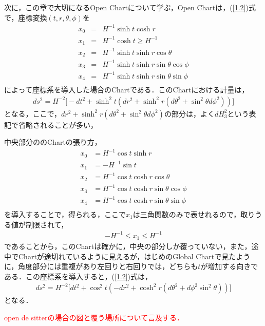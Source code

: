 次に，この章で大切になるOpen Chartについて学ぶ，Open Chartは，(\ref{1.2})式で，座標変換$(t,r,\theta,\phi)$を
\begin{eqnarray}
  x_0&=&H^{-1}\sinh{t}\cosh{r} \\
  x_1&=&H^{-1}\cosh{t} \geqslant H^{-1} \\
  x_2&=&H^{-1}\sinh{t}\sinh{r}\cos{\theta} \\
  x_3&=&H^{-1}\sinh{t}\sinh{r}\sin{\theta}\cos{\phi} \\
  x_4&=&H^{-1}\sinh{t}\sinh{r}\sin{\theta}\sin{\phi} \\
\end{eqnarray}
によって座標系を導入した場合のChartである．このChartにおける計量は，
\begin{eqnarray}
\label{openM}
      ds^2=H^{-2}\biggr[-dt^2+\sinh^2{t}(dr^2+\sinh^2r(d\theta^2+\sin^2\theta d\phi^2))\biggr]
\end{eqnarray}
となる，ここで，$dr^2+\sinh^2r(d\theta^2+\sin^2\theta d\phi^2)$の部分は，よく$dH_3^2$という表記で省略されることが多い，

中央部分ののChartの張り方，
\begin{align}
  \label{1.19}
  x_0&=H^{-1}\cos{t}\sinh{r} \\
  \label{test}
  x_1&=-H^{-1}\sin{t} \\
  x_2&=H^{-1}\cos{t}\cosh{r}\cos{\theta} \\
  x_3&=H^{-1}\cos{t}\cosh{r}\sin{\theta}\cos{\phi} \\
  x_4&=H^{-1}\cos{t}\cosh{r}\sin{\theta}\sin{\phi} \\
\end{align}
を導入することで，得られる，ここで$x_1$は三角関数のみで表せれるので，取りうる値が制限されて，
\begin{align}
  -H^{-1} \leqslant x_1 \leqslant H^{-1}
\end{align}
であることから，このChartは確かに，中央の部分しか覆っていない，また，途中でChartが途切れているように見えるが，はじめのGlobal Chartで見たように，角度部分には重複があり左回りと右回りでは，どちらも$t$が増加する向きである．この座標系を導入すると，(\ref{1.2})式は，
\begin{align}
\label{CenterM}
  ds^2=H^{-2}\biggl[dt^2+\cos^2t(-dr^2+\cosh^2r(d\theta^2+d\phi^2\sin^2\theta))\biggr]
\end{align}
となる．


\textcolor{red}{open de sitterの場合の図と覆う場所について言及する．}

